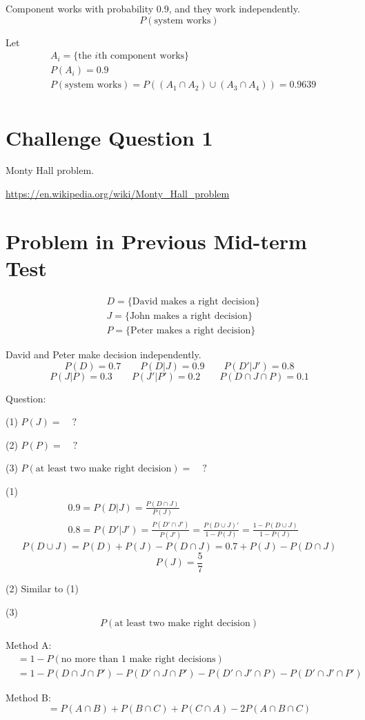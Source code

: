 \begin{exmp}
Component works with probability 0.9, and they work independently.
\[P(\text{system works})\]

Let
\begin{align*}
&A_i=\{ \text{the }i\text{th component works} \}	\\
&P(A_i)=0.9	\\
&P(\text{system works})=P\left( (A_1 \cap A_2)\cup(A_3 \cap A_4) \right)=0.9639\\
\end{align*}
\end{exmp}

\section{Challenge Question 1}
Monty Hall problem.

\url{https://en.wikipedia.org/wiki/Monty_Hall_problem}


\section{Problem in Previous Mid-term Test}
 \begin{exmp}
 \begin{align*}
   &D=\{\text{David makes a right decision}\}	\\
   &J=\{\text{John makes a right decision}\}	\\
   &P=\{\text{Peter makes a right decision}\}	
 \end{align*}

David and Peter make decision independently.
  \[  P(D) = 0.7 \qquad P(D|J)=0.9 \qquad P(D'|J')=0.8  \]
  \[  P(J|P)=0.3 \qquad P(J'|P')=0.2 \qquad P(D \cap J\cap P)=0.1 \]

  Question: 
  
  (1) $P(J)= \quad ?$ 
  
  (2) $P(P)= \quad ?$ 
  
  (3) $P(\text{at least two make right decision})=\quad ?$
\end{exmp}

\begin{solution}
  (1)
  \begin{align*}
  &0.9=P(D|J)=\frac{P(D \cap J)}{P(J)}  \\
  &0.8=P(D'|J')=\frac{P(D'\cap J')}{P(J')}=\frac{P(D\cup J)'}{1-P(J)}=\frac{1-P(D\cup J)}{1-P(J)}
  \end{align*}
  \[P(D\cup J)=P(D)+P(J)-P(D \cap J)=0.7+P(J)-P(D \cap J)\]
  \[P(J)=\frac{5}{7}\]

  (2) Similar to (1)

  (3)
  \[P(\text{at least two make right decision})\]
  
Method A:
\begin{align*}
  &=1-P(\text{no more than 1 make right decisions})\\
  &=1-P(D \cap J \cap P')-P(D' \cap J \cap P')-P(D' \cap J' \cap P)-P(D' \cap J' \cap P')
\end{align*}

Method B:
\[ =P(A \cap B)+P(B \cap C) + P(C \cap A)-2 P(A\cap B \cap C)\]
\end{solution}